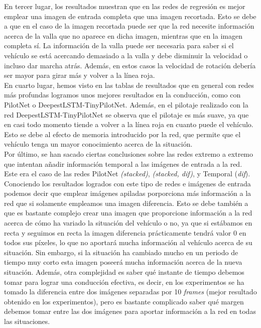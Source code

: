 En tercer lugar, los resultados muestran que en las redes de regresión es mejor emplear una imagen de entrada completa que una imagen recortada. Esto se debe a que en el caso de la imagen recortada puede ser que la red necesite información acerca de la valla que no aparece en dicha imagen, mientras que en la imagen completa sí. La información de la valla puede ser necesaria para saber si el vehículo se está acercando demasiado a la valla y debe disminuir la velocidad o incluso dar marcha atrás. Además, en estos casos la velocidad de rotación debería ser mayor para girar más y volver a la línea roja.\\

En cuarto lugar, hemos visto en las tablas de resultados que en general con redes más profundas logramos unos mejores resultados en la conducción, como con PilotNet o DeepestLSTM-TinyPilotNet. Además, en el pilotaje realizado con la red DeepestLSTM-TinyPilotNet se observa que el pilotaje es más suave, ya que en casi todo momento tiende a volver a la línea roja en cuanto puede el vehículo. Esto se debe al efecto de memoria introducido por la red, que permite que el vehículo tenga un mayor conocimiento acerca de la situación.\\

Por último, se han sacado ciertas conclusiones sobre las redes extremo a extremo que intentan añadir información temporal a las imágenes de entrada a la red. Este era el caso de las redes PilotNet \textit{(stacked)}, \textit{(stacked, dif)}, y Temporal (\textit{dif}). Conociendo los resultados logrados con este tipo de redes e imágenes de entrada podemos decir que emplear imágenes apiladas porporciona más información a la red que si solamente empleamos una imagen diferencia. Esto se debe también a que es bastante complejo crear una imagen que proporcione información a la red acerca de cómo ha variado la situación del vehículo o no, ya que si estábamos en recta y seguimos en recta la imagen diferencia prácticamente tendrá valor 0 en todos sus píxeles, lo que no aportará mucha información al vehículo acerca de su situación. Sin embargo, si la situación ha cambiado mucho en un periodo de tiempo muy corto esta imagen poseerá mucha información acerca de la nueva situación. Además, otra complejidad es saber qué instante de tiempo debemos tomar para lograr una conducción efectiva, es decir, en los experimentos se ha tomado la diferencia entre dos imágenes separadas por 10 \textit{frames} (mejor resultado obtenido en los experimentos), pero es bastante complicado saber qué margen debemos tomar entre las dos imágenes para aportar información a la red en todas las situaciones.\\

